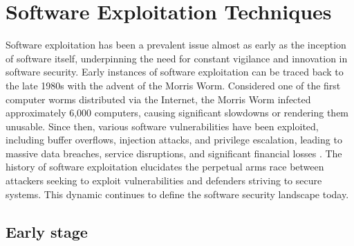 \documentclass{article}
\begin{document}

\section{Software Exploitation Techniques}%
Software exploitation has been a prevalent issue almost as early as the inception of software itself, underpinning the need for constant vigilance and innovation in software security. Early instances of software exploitation can be traced back to the late 1980s with the advent of the Morris Worm. Considered one of the first computer worms distributed via the Internet, the Morris Worm infected approximately 6,000 computers, causing significant slowdowns or rendering them unusable. Since then, various software vulnerabilities have been exploited, including buffer overflows, injection attacks, and privilege escalation, leading to massive data breaches, service disruptions, and significant financial losses . The history of software exploitation elucidates the perpetual arms race between attackers seeking to exploit vulnerabilities and defenders striving to secure systems. This dynamic continues to define the software security landscape today.

\subsection{Early stage}
\end{document}
